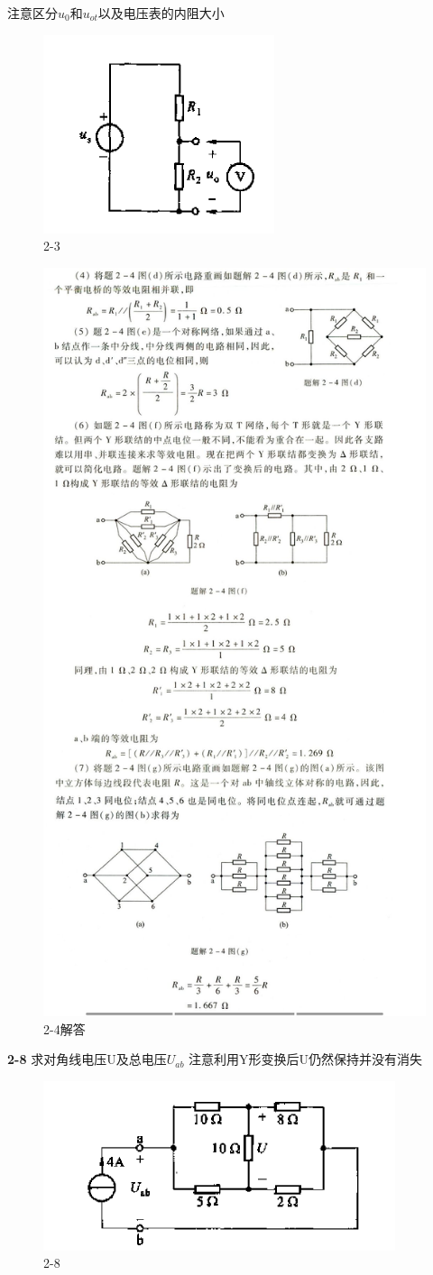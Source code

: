 \documentclass[11pt,a4paper,oneside]{book}
\begin{document}
注意区分$u_0$和$u_{ot}$以及电压表的内阻大小
\begin{figure}[H]
	\centering
	\includegraphics[width=0.3\linewidth]{screenshot029}
	\caption{2-3}
	\label{fig:screenshot029}
\end{figure}

\begin{figure}[H]
	\centering
	\includegraphics[width=0.7\linewidth]{2-4}
	\caption{2-4解答}
	\label{fig:2-4}
\end{figure}

\newpage
\noindent\textbf{2-8} 求对角线电压U及总电压$U_{ab}$ \quad 注意利用Y形变换后U仍然保持并没有消失
\begin{figure}[H]
	\centering
	\includegraphics[width=0.5\linewidth]{screenshot032}
	\caption{2-8}
	\label{fig:screenshot032}
\end{figure}
\end{document}
